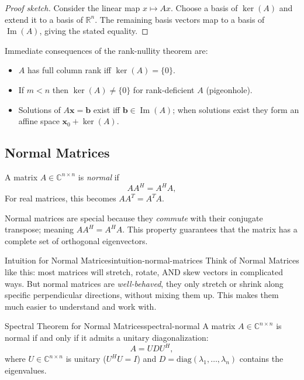 \begin{proof}[Proof sketch]
    Consider the linear map $x\mapsto Ax$. Choose a basis of $\ker(A)$ and extend it to a basis of $\mathbb{R}^n$. The remaining basis vectors map to a basis of $\operatorname{Im}(A)$, giving the stated equality.
\end{proof}

Immediate consequences of the rank-nullity theorem are:
\begin{itemize}
    \item $A$ has full column rank iff $\ker(A)=\{0\}$.
    \item If $m<n$ then $\ker(A)\neq\{0\}$ for rank-deficient $A$ (pigeonhole).
    \item Solutions of $A\mathbf{x}=\mathbf{b}$ exist iff $\mathbf{b}\in\operatorname{Im}(A)$; when solutions exist they form an affine space $\mathbf{x}_0+\ker(A)$.
\end{itemize}

\subsection{Normal Matrices}
\label{subsec:normal-matrices}

A matrix $A \in \mathbb{C}^{n \times n}$ is \emph{normal} if
\[
    AA^H = A^H A,
\]
For real matrices, this becomes $AA^T = A^TA$.

Normal matrices are special because they \emph{commute} with their conjugate transpose; meaning $A A^H = A^H A$. This property guarantees that the matrix has a complete set of orthogonal eigenvectors.

\begin{remark}{Intuition for Normal Matrices}{intuition-normal-matrices}
    Think of Normal Matrices like this: most matrices will stretch, rotate, AND skew vectors in complicated ways. But normal matrices are \emph{well-behaved}, they only stretch or shrink along specific perpendicular directions, without mixing them up. This makes them much easier to understand and work with.
\end{remark}

\begin{theorem}{Spectral Theorem for Normal Matrices}{spectral-normal}
    A matrix $A \in \mathbb{C}^{n \times n}$ is normal if and only if it admits a unitary diagonalization:
    \[
        A = U D U^H,
    \]
    where $U \in \mathbb{C}^{n \times n}$ is unitary ($U^H U = I$) and $D = \text{diag}(\lambda_1, \ldots, \lambda_n)$ contains the eigenvalues.
\end{theorem}

